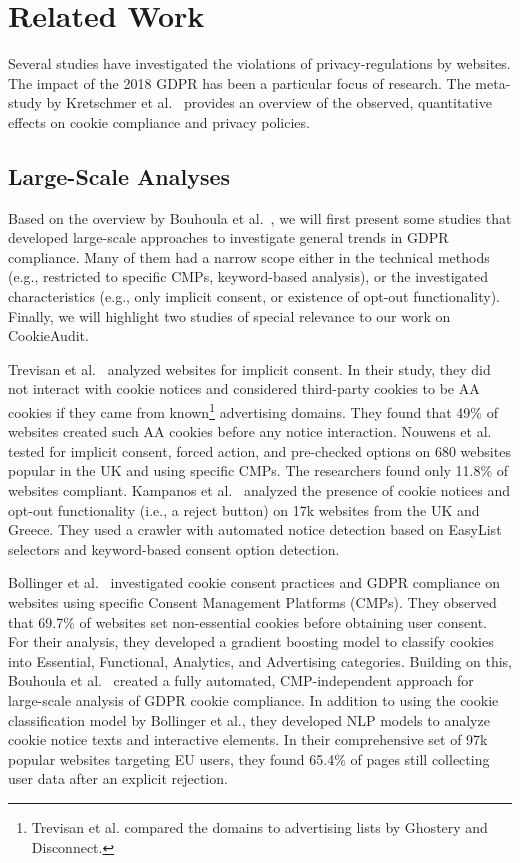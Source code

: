 \chapter{Related Work}

Several studies have investigated the violations of privacy-regulations by websites.
The impact of the 2018 GDPR has been a particular focus of research.
The meta-study by Kretschmer et al.~\cite{kretschmer2021cookie} provides an overview of the observed, quantitative effects on cookie compliance and privacy policies.

\section{Large-Scale Analyses}
Based on the overview by Bouhoula et al.~\cite{bouhoula2023automated}, we will first present some studies that developed large-scale approaches to investigate general trends in GDPR compliance. 
Many of them had a narrow scope either in the technical methods (e.g., restricted to specific CMPs, keyword-based analysis), or the investigated characteristics (e.g., only implicit consent, or existence of opt-out functionality).
Finally, we will highlight two studies of special relevance to our work on CookieAudit. 

Trevisan et al.~\cite{trevisan2019cookielaw} analyzed websites for implicit consent.
In their study, they did not interact with cookie notices and considered third-party cookies to be AA cookies if they came from known\footnote{
Trevisan et al. compared the domains to advertising lists by Ghostery and Disconnect.
} advertising domains.
They found that 49\% of websites created such AA cookies before any notice interaction.
Nouwens et al.~\cite{nouwens2020dark} tested for implicit consent, forced action, and pre-checked options on 680 websites popular in the UK and using specific CMPs. 
The researchers found only 11.8\% of websites compliant.
Kampanos et al.~\cite{kampanos2021accept} analyzed the presence of cookie notices and opt-out functionality (i.e., a reject button) on 17k websites from the UK and Greece.
They used a crawler with automated notice detection based on EasyList selectors and keyword-based consent option detection.

Bollinger et al.~\cite{bollinger2022automating} investigated cookie consent practices and GDPR compliance on websites using specific Consent Management Platforms (CMPs). 
They observed that 69.7\% of websites set non-essential cookies before obtaining user consent. 
For their analysis, they developed a gradient boosting model to classify cookies into Essential, Functional, Analytics, and Advertising categories.
Building on this, Bouhoula et al.~\cite{bouhoula2023automated} created a fully automated, CMP-independent approach for large-scale analysis of GDPR cookie compliance. 
In addition to using the cookie classification model by Bollinger et al., they developed NLP models to analyze cookie notice texts and interactive elements. 
In their comprehensive set of 97k popular websites targeting EU users, they found 65.4\% of pages still collecting user data after an explicit rejection.

